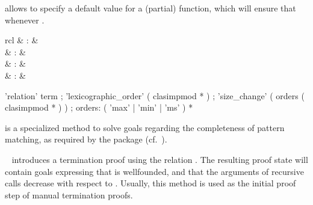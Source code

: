 \begin{isabellebody}
\begin{isamarkuptext}
\begin{description}
  \item {} allows to specify a default value for a
  (partial) function, which will ensure that 
  whenever .

  \end{description}%
\end{isamarkuptext}%
\isamarkuptrue%
%
\isamarkuptrue%
%
\begin{isamarkuptext}%
\begin{matharray}{rcl}
    \hypertarget{method.HOL.pat-completeness}{\hyperlink{method.HOL.pat-completeness}{\mbox{}}} & : &  \\
    \hypertarget{method.HOL.relation}{\hyperlink{method.HOL.relation}{\mbox{}}} & : &  \\
    \hypertarget{method.HOL.lexicographic-order}{\hyperlink{method.HOL.lexicographic-order}{\mbox{}}} & : &  \\
    \hypertarget{method.HOL.size-change}{\hyperlink{method.HOL.size-change}{\mbox{}}} & : &  \\
  \end{matharray}

  \begin{rail}
    'relation' term
    ;
    'lexicographic\_order' ( clasimpmod * )
    ;
    'size\_change' ( orders ( clasimpmod * ) )
    ;
    orders: ( 'max' | 'min' | 'ms' ) *
  \end{rail}

  \begin{description}

  \item \hyperlink{method.HOL.pat-completeness}{\mbox{}} is a specialized method to
  solve goals regarding the completeness of pattern matching, as
  required by the \hyperlink{command.HOL.function}{\mbox{}} package (cf.\
  \cite{isabelle-function}).

  \item \hyperlink{method.HOL.relation}{\mbox{}}~ introduces a termination
  proof using the relation .  The resulting proof state will
  contain goals expressing that  is wellfounded, and that the
  arguments of recursive calls decrease with respect to \isa{R}.
  Usually, this method is used as the initial proof step of manual
  termination proofs.


\end{description}
\end{isamarkuptext}
\end{isabellebody}
